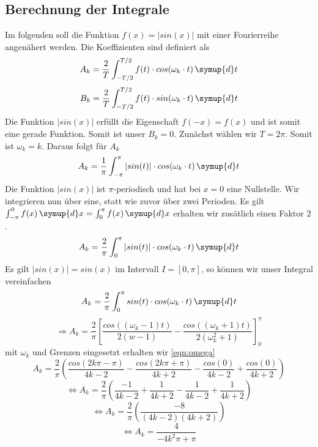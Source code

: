 \subsection{Berechnung der Integrale}
Im folgenden soll die Funktion $f(x)=|sin(x)|$ mit einer Fourierreihe angenähert werden.
Die Koeffizienten sind definiert als
\begin{equation}
A_k=\frac{2}{T} \int_{-T/2}^{T/2} f(t) \cdot cos(\omega_k \cdot t)  \, \symup{d}t
\end{equation}
\begin{equation}
B_k=\frac{2}{T} \int_{-T/2}^{T/2} f(t) \cdot sin(\omega_k \cdot t)  \, \symup{d}t
\end{equation}
Die Funktion $|sin(x)|$ erfüllt die Eigenschaft $f(-x) = f(x)$ und ist somit eine gerade Funktion.
Somit ist unser $B_k=0$. 
Zunächst wählen wir $T=2\pi$. Somit ist $\omega_k =k$.
Daraus folgt für $A_k$
\begin{equation}
A_k=\frac{1}{\pi} \int_{-\pi}^{\pi} |sin(t)| \cdot cos(\omega_k \cdot t) \, \symup{d}t
\end{equation}
Die Funktion $|sin(x)|$ ist $\pi$-periodisch und hat bei $x = 0$ eine Nullstelle.
Wir integrieren nun über eine, statt wie zuvor über zwei Perioden. Es gilt 
$\int_{-\pi}^{0}f(x) \, \symup{d}x = \int_0^{\pi} f(x) \, \symup{d}x$
erhalten wir zusätlich einen Faktor $2$.
\begin{equation}
A_k=\frac{2}{\pi} \int_0^{\pi} |sin(t)| \cdot cos(\omega_k \cdot t) \, \symup{d}t
\end{equation}
Es gilt $|sin(x)| = sin(x)$ im Intervall $I=[0,\pi]$, so können wir
unser Integral vereinfachen
\begin{equation}
A_k=\frac{2}{\pi} \int_0^{\pi} sin(t) \cdot cos(\omega_k \cdot t)  \, \symup{d}t
\end{equation}
\begin{equation}
\Rightarrow A_k= \frac{2}{\pi} \left [ \frac{cos((\omega_k-1)t)}{2(w-1)} - \frac{cos((\omega_k+1)t)}{2(\omega_k^2+1)} \right ]_0^{\pi}
\end{equation}
mit $\omega_k$ und Grenzen eingesetzt erhalten wir
\eqref{eqn:omega}
\begin{equation}
A_k=\frac{2}{\pi}\left ( \frac{cos(2k\pi-\pi)}{4k-2} - \frac{cos(2k\pi+\pi)}{4k+2} - \frac{cos(0)}{4k-2} + \frac{cos(0)}{4k+2} \right )
\end{equation}
\begin{equation}
\Leftrightarrow A_k=\frac{2}{\pi}\left ( \frac{-1}{4k-2} + \frac{1}{4k+2} - \frac{1}{4k-2} + \frac{1}{4k+2} \right )
\end{equation}
\begin{equation}
\Leftrightarrow A_k= \frac{2}{\pi} \left ( \frac{-8}{(4k-2)(4k+2)} \right )
\end{equation}
\begin{equation}
\Leftrightarrow A_k= \frac{4}{-4k^2 \pi + \pi}
\end{equation}
